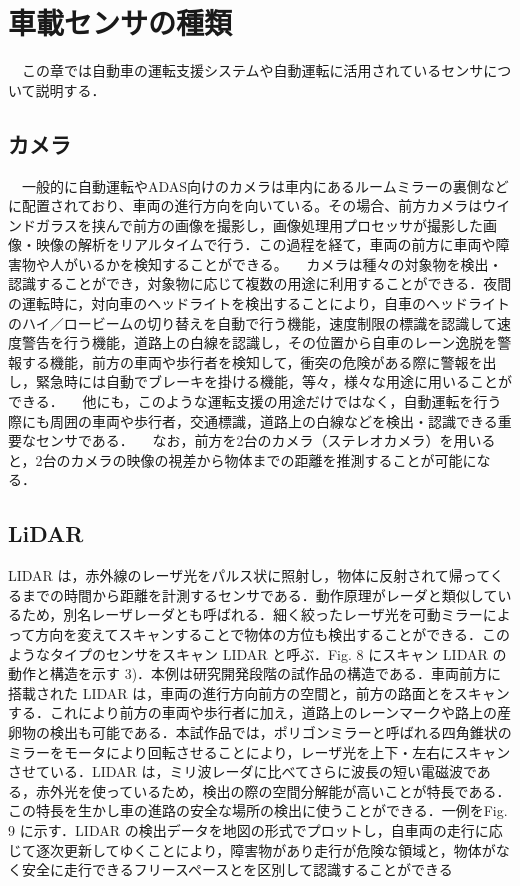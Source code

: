 \chapter{車載センサの種類}
　この章では自動車の運転支援システムや自動運転に活用されているセンサについて説明する．
\section{カメラ}
　一般的に自動運転やADAS向けのカメラは車内にあるルームミラーの裏側などに配置されており、車両の進行方向を向いている。その場合、前方カメラはウインドガラスを挟んで前方の画像を撮影し，画像処理用プロセッサが撮影した画像・映像の解析をリアルタイムで行う．この過程を経て，車両の前方に車両や障害物や人がいるかを検知することができる。\cite{lidar_datasheet}
　カメラは種々の対象物を検出・認識することができ，対象物に応じて複数の用途に利用することができる．夜間の運転時に，対向車のヘッドライトを検出することにより，自車のヘッドライトのハイ／ロービームの切り替えを自動で行う機能，速度制限の標識を認識して速度警告を行う機能，道路上の白線を認識し，その位置から自車のレーン逸脱を警報する機能，前方の車両や歩行者を検知して，衝突の危険がある際に警報を出し，緊急時には自動でブレーキを掛ける機能，等々，様々な用途に用いることができる．
　他にも，このような運転支援の用途だけではなく，自動運転を行う際にも周囲の車両や歩行者，交通標識，道路上の白線などを検出・認識できる重要なセンサである．
　なお，前方を2台のカメラ（ステレオカメラ）を用いると，2台のカメラの映像の視差から物体までの距離を推測することが可能になる．\cite{lidar_datasheet}

\section{LiDAR}
LIDAR は，赤外線のレーザ光をパルス状に照射し，物体に反射されて帰ってくるまでの時間から距離を計測するセンサである．動作原理がレーダと類似しているため，別名レーザレーダとも呼ばれる．細く絞ったレーザ光を可動ミラーによって方向を変えてスキャンすることで物体の方位も検出することができる．このようなタイプのセンサをスキャン LIDAR と呼ぶ．Fig. 8 にスキャン LIDAR の動作と構造を示す 3)．本例は研究開発段階の試作品の構造である．車両前方に搭載された LIDAR は，車両の進行方向前方の空間と，前方の路面とをスキャンする．これにより前方の車両や歩行者に加え，道路上のレーンマークや路上の産卵物の検出も可能である．本試作品では，ポリゴンミラーと呼ばれる四角錐状のミラーをモータにより回転させることにより，レーザ光を上下・左右にスキャンさせている．LIDAR は，ミリ波レーダに比べてさらに波長の短い電磁波である，赤外光を使っているため，検出の際の空間分解能が高いことが特長である．この特長を生かし車の進路の安全な場所の検出に使うことができる．一例をFig. 9 に示す．LIDAR の検出データを地図の形式でプロットし，自車両の走行に応じて逐次更新してゆくことにより，障害物があり走行が危険な領域と，物体がなく安全に走行できるフリースペースとを区別して認識することができる

